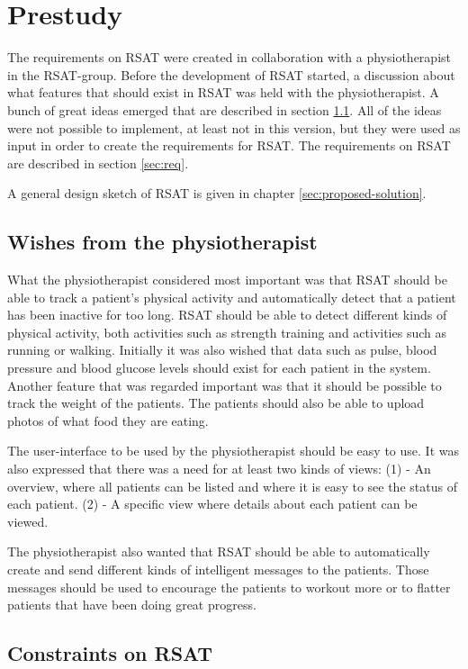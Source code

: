\documentclass{cslthse-msc}
\begin{document}
\chapter{Prestudy}

The requirements on RSAT were created in collaboration with a physiotherapist in the RSAT-group. Before the development of RSAT started, a discussion about what features that should exist in RSAT was held with the physiotherapist. A bunch of great ideas emerged that are described in section \ref{sec:wishes}. All of the ideas were not possible to implement, at least not in this version, but they were used as input in order to create the requirements for RSAT. The requirements on RSAT are described in section \ref{sec:req}.

A general design sketch of RSAT is given in chapter \ref{sec:proposed-solution}.


\section{Wishes from the physiotherapist}
\label{sec:wishes}

What the physiotherapist considered most important was that RSAT should be able to track a patient’s physical activity and automatically detect that a patient has been inactive for too long. RSAT should be able to detect different kinds of physical activity, both activities such as strength training and activities such as running or walking. Initially it was also wished that data such as pulse, blood pressure and blood glucose levels should exist for each patient in the system. Another feature that was regarded important was that it should be possible to track the weight of the patients. The patients should also be able to upload photos of what food they are eating.

The user-interface to be used by the physiotherapist should be easy to use. It was also expressed that there was a need for at least two kinds of views: (1) - An overview, where all patients can be listed and where it is easy to see the status of each patient. (2) - A specific view where details about each patient can be viewed.

The physiotherapist also wanted that RSAT should be able to automatically create and send different kinds of intelligent messages to the patients. Those messages should be used to encourage the patients to workout more or to flatter patients that have been doing great progress. 


\section{Constraints on RSAT}
\end{document}
